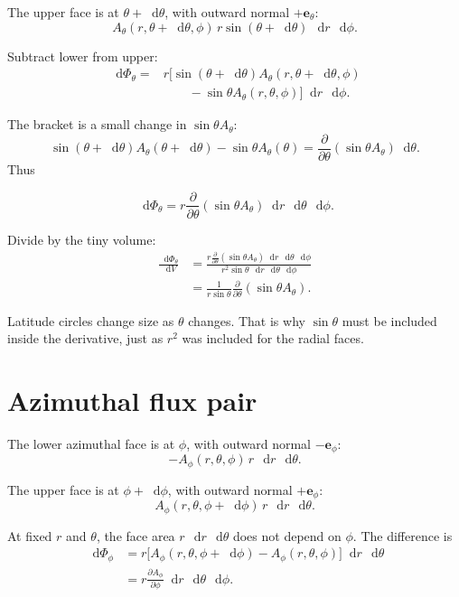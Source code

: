 \documentclass[11pt,a4paper]{article}
\newcommand{\etheta}{\bm e_\theta}
\newcommand{\ephi}{\bm e_\phi}
\newcommand{\dd}{\mathop{}\!\mathrm d}
\begin{document}
The upper face is at \(\theta+\dd\theta\), with outward normal \(+\etheta\):
\[
  A_\theta(r,\theta+\dd\theta,\phi)\,
  r\sin(\theta+\dd\theta)\,\dd r\,\dd\phi.
\]

Subtract lower from upper:
\begin{align*}
  \dd\Phi_\theta
  ={}&r\Big[
  \sin(\theta+\dd\theta)A_\theta(r,\theta+\dd\theta,\phi)\\
  &\qquad-\sin\theta A_\theta(r,\theta,\phi)
  \Big]\dd r\,\dd\phi.
\end{align*}

The bracket is a small change in \(\sin\theta A_\theta\):
\[
  \sin(\theta+\dd\theta)A_\theta(\theta+\dd\theta)
  -\sin\theta A_\theta(\theta)
  =
  \frac{\partial}{\partial\theta}
  (\sin\theta A_\theta)\dd\theta.
\]
Thus
\begin{result}
\[
  \boxed{
  \dd\Phi_\theta
  =r\frac{\partial}{\partial\theta}
  (\sin\theta A_\theta)
  \dd r\,\dd\theta\,\dd\phi.}
\]
\end{result}

Divide by the tiny volume:
\begin{align*}
  \frac{\dd\Phi_\theta}{\dd V}
  &=
  \frac{
  r\frac{\partial}{\partial\theta}(\sin\theta A_\theta)
  \dd r\,\dd\theta\,\dd\phi
  }{
  r^2\sin\theta\,\dd r\,\dd\theta\,\dd\phi
  }\\
  &=\boxed{
  \frac{1}{r\sin\theta}
  \frac{\partial}{\partial\theta}(\sin\theta A_\theta)}.
\end{align*}

\begin{idea}
Latitude circles change size as \(\theta\) changes. That is why \(\sin\theta\) must be included inside the derivative, just as \(r^2\) was included for the radial faces.
\end{idea}

\clearpage

\section{Azimuthal flux pair}

The lower azimuthal face is at \(\phi\), with outward normal \(-\ephi\):
\[
  -A_\phi(r,\theta,\phi)\,
  r\,\dd r\,\dd\theta.
\]

The upper face is at \(\phi+\dd\phi\), with outward normal \(+\ephi\):
\[
  A_\phi(r,\theta,\phi+\dd\phi)\,
  r\,\dd r\,\dd\theta.
\]

At fixed \(r\) and \(\theta\), the face area \(r\,\dd r\,\dd\theta\) does not depend on \(\phi\). The difference is
\begin{align*}
  \dd\Phi_\phi
  &=r\Big[
  A_\phi(r,\theta,\phi+\dd\phi)
  -A_\phi(r,\theta,\phi)
  \Big]\dd r\,\dd\theta\\
  &=r\frac{\partial A_\phi}{\partial\phi}
  \dd r\,\dd\theta\,\dd\phi.
\end{align*}
\end{document}
